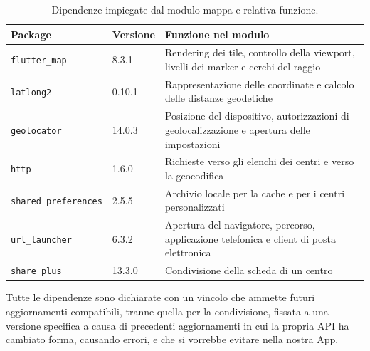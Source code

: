 \begin{table}[H]
\footnotesize
\begin{tabularx}{\textwidth}{@{}P{4.1cm} P{1.6cm} L@{}}
\toprule
\textbf{Package} & \textbf{Versione} & \textbf{Funzione nel modulo} \tabularnewline
\midrule
\texttt{flutter\_map} & 8.3.1 & Rendering dei tile, controllo della viewport, livelli dei marker e cerchi del raggio \cite{flutterMapPkg} \tabularnewline
\texttt{latlong2} & 0.10.1 & Rappresentazione delle coordinate e calcolo delle distanze geodetiche \cite{latlong2Pkg} \tabularnewline
\texttt{geolocator} & 14.0.3 & Posizione del dispositivo, autorizzazioni di geolocalizzazione e apertura delle impostazioni \cite{geolocatorPkg} \tabularnewline
\texttt{http} & 1.6.0 & Richieste verso gli elenchi dei centri e verso la geocodifica \cite{httpPkg} \tabularnewline
\texttt{shared\_preferences} & 2.5.5 & Archivio locale per la cache e per i centri personalizzati \cite{sharedPrefsPkg} \tabularnewline
\texttt{url\_launcher} & 6.3.2 & Apertura del navigatore, percorso, applicazione telefonica e client di posta elettronica \cite{urlLauncherPkg} \tabularnewline
\texttt{share\_plus} & 13.3.0 & Condivisione della scheda di un centro \cite{sharePlusPkg} \tabularnewline
\bottomrule
\end{tabularx}
\caption{Dipendenze impiegate dal modulo mappa e relativa funzione.}
\label{tab:dipendenze}
\end{table}

Tutte le dipendenze sono dichiarate con un vincolo che ammette futuri aggiornamenti compatibili, tranne quella per la
condivisione, fissata a una versione specifica a causa di precedenti aggiornamenti in cui la propria API ha cambiato forma,
causando errori, e che si vorrebbe evitare nella nostra App.

